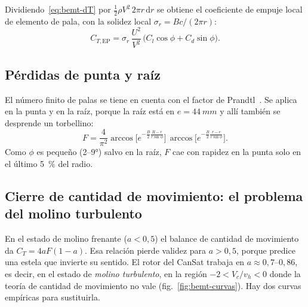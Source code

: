 Dividiendo~\eqref{eq:bemt-dT} por $\tfrac12\rho V^2\,2\pi r\,\mathrm{d}r$ se obtiene el
coeficiente de empuje local de elemento de pala, con la solidez local
$\sigma_r=Bc/(2\pi r)$:
\begin{equation}
  C_{T,\mathrm{EP}}=\sigma_r\,\frac{U^2}{V^2}\,\big(C_l\cos\phi+C_d\sin\phi\big).
  \label{eq:bemt-ctbe}
\end{equation}

\subsection{Pérdidas de punta y raíz}

El número finito de palas se tiene en cuenta con el factor de Prandtl~\cite{leishman2006}.
Se aplica en la punta y en la raíz, porque la raíz está en $e=\SI{44}{mm}$ y allí también
se desprende un torbellino:
\begin{equation}
  F=\frac{4}{\pi^2}\arccos\!\Big[e^{-\frac{B}{2}\frac{R-r}{r\sin\phi}}\Big]\,
         \arccos\!\Big[e^{-\frac{B}{2}\frac{r-e}{r\sin\phi}}\Big].
  \label{eq:bemt-F}
\end{equation}
Como $\phi$ es pequeño (2--\ang{9}) salvo en la raíz, $F$ cae con rapidez en la punta solo en el último
\SI{5}{\percent} del radio.

\subsection{Cierre de cantidad de movimiento: el problema del molino turbulento}\label{sec:bemt-cierre}

En el estado de molino frenante ($a<0{,}5$) el balance de cantidad de movimiento da
$C_T=4aF(1-a)$. Esa relación pierde validez para $a>0{,}5$, porque predice una estela
que invierte su sentido. El rotor del CanSat trabaja en $a\approx0{,}7$--$0{,}86$, es
decir, en el estado de \emph{molino turbulento}, en la región $-2<V_c/v_h<0$ donde la
teoría de cantidad de movimiento no vale (fig.~\ref{fig:bemt-curvas}). Hay dos curvas
empíricas para sustituirla.

